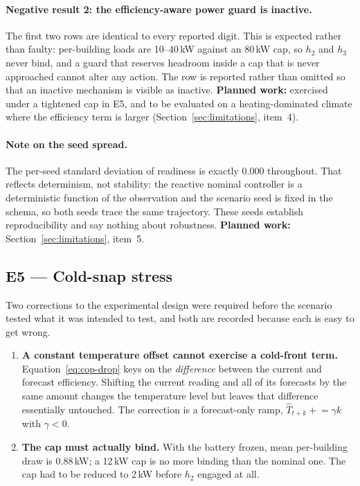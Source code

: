 \documentclass[11pt]{article}
\begin{document}
\paragraph{Negative result 2: the efficiency-aware power guard is inactive.} The
first two rows are identical to every reported digit. This is expected rather
than faulty: per-building loads are 10--40\,kW against an 80\,kW cap, so $h_2$
and $h_3$ never bind, and a guard that reserves headroom inside a cap that is
never approached cannot alter any action. The row is reported rather than
omitted so that an inactive mechanism is visible as inactive.
\textbf{Planned work:} exercised under a tightened cap in E5, and to be evaluated
on a heating-dominated climate where the efficiency term is larger
(Section~\ref{sec:limitations}, item~4).

\paragraph{Note on the seed spread.} The per-seed standard deviation of readiness
is exactly $0.000$ throughout. That reflects determinism, not stability: the
reactive nominal controller is a deterministic function of the observation and
the scenario seed is fixed in the schema, so both seeds trace the same
trajectory. These seeds establish reproducibility and say nothing about
robustness. \textbf{Planned work:} Section~\ref{sec:limitations}, item~5.

\subsection{E5 --- Cold-snap stress}
\label{sec:exp-stress}

Two corrections to the experimental design were required before the scenario
tested what it was intended to test, and both are recorded because each is easy
to get wrong.

\begin{enumerate}[nosep]
\item \textbf{A constant temperature offset cannot exercise a cold-front term.}
Equation~\ref{eq:cop-drop} keys on the \emph{difference} between the current and
forecast efficiency. Shifting the current reading and all of its forecasts by the
same amount changes the temperature level but leaves that difference essentially
untouched. The correction is a forecast-only ramp,
$\hat T_{t+k} \mathrel{+}= \gamma k$ with $\gamma < 0$.
\item \textbf{The cap must actually bind.} With the battery frozen, mean
per-building draw is $0.88$\,kW; a 12\,kW cap is no more binding than the nominal
one. The cap had to be reduced to 2\,kW before $h_2$ engaged at all.
\end{enumerate}
\end{document}

